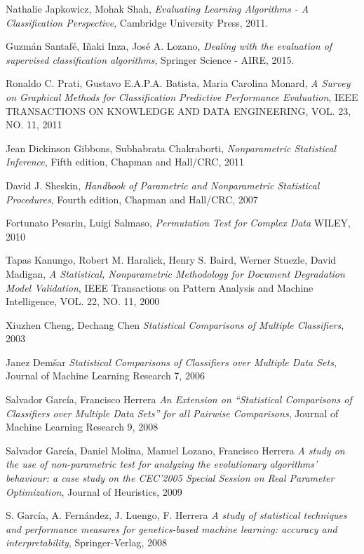 \begin{thebibliography}{99}

  Nathalie Japkowicz, Mohak Shah,
  \emph{Evaluating Learning Algorithms - A Classification Perspective},
  Cambridge University Press,
  2011.

  Guzmán Santafé, Iñaki Inza, José A. Lozano,
  \emph{Dealing with the evaluation of supervised classification algorithms},
  Springer Science - AIRE,
  2015.
  
  Ronaldo C. Prati, Gustavo E.A.P.A. Batista, Maria Carolina Monard,
  \emph{A Survey on Graphical Methods for Classification Predictive Performance Evaluation},
  IEEE TRANSACTIONS ON KNOWLEDGE AND DATA ENGINEERING, VOL. 23, NO. 11,
  2011

  Jean Dickinson Gibbons, Subhabrata Chakraborti,
  \emph{Nonparametric Statistical Inference},
  Fifth edition,
  Chapman and Hall/CRC,
  2011
	
  David J. Sheskin,
  \emph{Handbook of Parametric and Nonparametric Statistical Procedures},
  Fourth edition,
  Chapman and Hall/CRC,
  2007
  
	Fortunato Pesarin, Luigi Salmaso,
	\emph{Permutation Test for Complex Data}
	WILEY, 
	2010
  
	Tapas Kanungo, Robert M. Haralick, Henry S. Baird, Werner Stuezle, David Madigan,
  \emph{A Statistical, Nonparametric Methodology for Document Degradation Model Validation},
  IEEE Transactions on Pattern Analysis and Machine Intelligence,
  VOL. 22, NO. 11,
  2000
  
	Xiuzhen Cheng, Dechang Chen
  \emph{Statistical Comparisons of Multiple Classifiers},
  2003
  
	Janez Dem\v{s}ar
	\emph{Statistical Comparisons of Classifiers over Multiple Data Sets},
	Journal of Machine Learning Research 7,
	2006
	
	
	Salvador García, Francisco Herrera
	\emph{An Extension on ``Statistical Comparisons of Classifiers over Multiple Data Sets'' for all Pairwise Comparisons},
	Journal of Machine Learning Research 9,
	2008
	
	Salvador García, Daniel Molina, Manuel Lozano, Francisco Herrera
	\emph{A study on the use of non-parametric test for analyzing the evolutionary algorithms' behaviour: a case study on the CEC'2005 Special Session on Real Parameter Optimization},
	Journal of Heuristics,
	2009

	S. García, A. Fernández, J. Luengo, F. Herrera
	\emph{A study of statistical techniques and performance measures for genetics-based machine learning: accuracy and interpretability},
	Springer-Verlag,
	2008
	
\end{thebibliography}